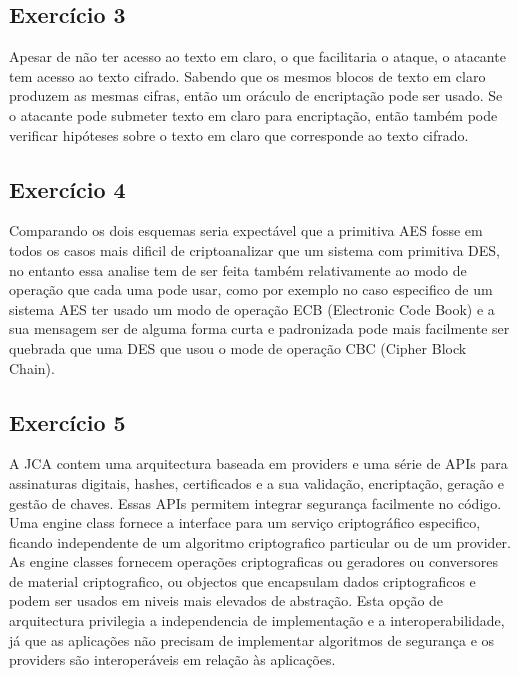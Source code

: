 \documentclass[11pt]{report}
\begin{document}
\subsection{Exercício 3}
Apesar de não ter acesso ao texto em claro, o que facilitaria o ataque, o atacante tem acesso ao texto cifrado. Sabendo que os mesmos blocos de texto em claro produzem as mesmas cifras, então um oráculo de encriptação pode ser usado. Se o atacante pode submeter texto em claro para encriptação, então também pode verificar hipóteses sobre o texto em claro que corresponde ao texto cifrado.\\

\newpage

\subsection{Exercício 4}
Comparando os dois esquemas seria expectável que a primitiva AES fosse em todos os casos mais dificil de criptoanalizar que um sistema com primitiva DES, no entanto essa analise tem de ser feita também relativamente ao modo de operação que cada uma pode usar, como por exemplo no caso especifico de um sistema AES ter usado um modo de operação ECB (Electronic Code Book) e a sua mensagem ser de alguma forma curta e padronizada pode mais facilmente ser quebrada que uma DES que usou o mode de operação CBC (Cipher Block Chain).\\

\subsection{Exercício 5}
A JCA contem uma arquitectura baseada em providers e uma série de APIs para assinaturas digitais, hashes, certificados e a sua validação, encriptação, geração e gestão de chaves. Essas APIs permitem integrar segurança facilmente no código.
Uma engine class fornece a interface para um serviço criptográfico especifico, ficando independente de um algoritmo criptografico particular ou de um provider. As engine classes fornecem operações criptograficas ou geradores ou conversores de material criptografico, ou objectos que encapsulam dados criptograficos e podem ser usados em niveis mais elevados de abstração.
Esta opção de arquitectura privilegia a independencia de implementação e a interoperabilidade, já que as aplicações não precisam de implementar algoritmos de segurança e os providers são interoperáveis em relação às aplicações.\\
\end{document}
